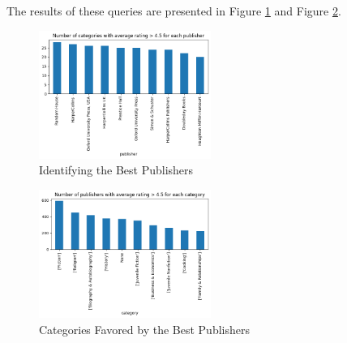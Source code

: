 The results of these queries are presented in Figure \ref{fig:h6_which_best} and Figure \ref{fig:h6_where_best}.

\begin{figure}[H]
    \centering
    \includegraphics[width=0.5\textwidth]{./figures/h6_which_best.png}
    \caption{Identifying the Best Publishers}
    \label{fig:h6_which_best}
\end{figure}

\begin{figure}[H]
    \centering
    \includegraphics[width=0.5\textwidth]{./figures/h6_where_best.png}
    \caption{Categories Favored by the Best Publishers}
    \label{fig:h6_where_best}
\end{figure}
